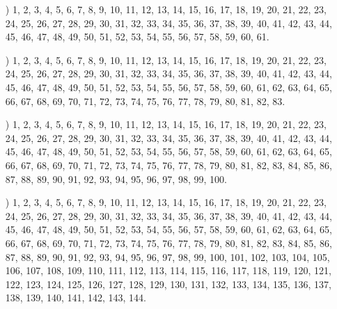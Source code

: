 \documentclass[a4paper,11pt]{article}
\numberwithin{equation}{section}
\begin{document}
\begin{itemize}
\item[\romannumeral8)] 1, 2, 3, 4, 5, 6, 7, 8, 9, 10, 11, 12, 13, 14, 15,
  16, 17, 18, 19, 20, 21, 22, 23, 24, 25, 26, 27, 28, 29, 30, 31, 32, 33,
  34, 35, 36, 37, 38, 39, 40, 41, 42, 43, 44, 45, 46, 47, 48, 49, 50, 51,
  52, 53, 54, 55, 56, 57, 58, 59, 60, 61.

\item[\romannumeral9)] 1, 2, 3, 4, 5, 6, 7, 8, 9, 10, 11, 12, 13, 14, 15,
  16, 17, 18, 19, 20, 21, 22, 23, 24, 25, 26, 27, 28, 29, 30, 31, 32, 33,
  34, 35, 36, 37, 38, 39, 40, 41, 42, 43, 44, 45, 46, 47, 48, 49, 50, 51,
  52, 53, 54, 55, 56, 57, 58, 59, 60, 61, 62, 63, 64, 65, 66, 67, 68, 69,
  70, 71, 72, 73, 74, 75, 76, 77, 78, 79, 80, 81, 82, 83.

\item[\romannumeral10)] 1, 2, 3, 4, 5, 6, 7, 8, 9, 10, 11, 12, 13, 14, 15,
  16, 17, 18, 19, 20, 21, 22, 23, 24, 25, 26, 27, 28, 29, 30, 31, 32, 33,
  34, 35, 36, 37, 38, 39, 40, 41, 42, 43, 44, 45, 46, 47, 48, 49, 50, 51,
  52, 53, 54, 55, 56, 57, 58, 59, 60, 61, 62, 63, 64, 65, 66, 67, 68, 69,
  70, 71, 72, 73, 74, 75, 76, 77, 78, 79, 80, 81, 82, 83, 84, 85, 86, 87,
  88, 89, 90, 91, 92, 93, 94, 95, 96, 97, 98, 99, 100.

\item[\romannumeral11)] 1, 2, 3, 4, 5, 6, 7, 8, 9, 10, 11, 12, 13, 14, 15,
  16, 17, 18, 19, 20, 21, 22, 23, 24, 25, 26, 27, 28, 29, 30, 31, 32, 33,
  34, 35, 36, 37, 38, 39, 40, 41, 42, 43, 44, 45, 46, 47, 48, 49, 50, 51,
  52, 53, 54, 55, 56, 57, 58, 59, 60, 61, 62, 63, 64, 65, 66, 67, 68, 69,
  70, 71, 72, 73, 74, 75, 76, 77, 78, 79, 80, 81, 82, 83, 84, 85, 86, 87,
  88, 89, 90, 91, 92, 93, 94, 95, 96, 97, 98, 99, 100, 101, 102, 103, 104,
  105, 106, 107, 108, 109, 110, 111, 112, 113, 114, 115, 116, 117, 118, 119,
  120, 121, 122, 123, 124, 125, 126, 127, 128, 129, 130, 131, 132, 133,
  134, 135, 136, 137, 138, 139, 140, 141, 142, 143, 144.

\end{itemize}










\end{document}
